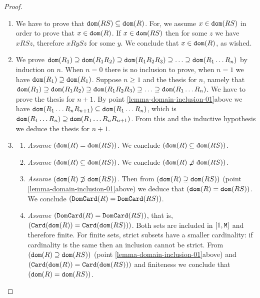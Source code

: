\documentclass{lmcs}
\begin{document}
\begin{proof}
\begin{enumerate}

\item
We have to prove that ${\tt dom}(RS) \subseteq {\tt dom}(R)$. For, we assume $x \in {\tt dom}(RS)$ in 
order to prove that $x \in {\tt dom}(R)$. If $x \in {\tt dom}(RS)$ then for some $z$ we have $x RS z$, 
therefore $x R y S z$ for some $y$. We conclude that $x \in {\tt dom}(R)$, as wished.

\item
We prove 
$
{\tt dom}(R_1) \supseteq 
{\tt dom}(R_1 R_2) \supseteq 
{\tt dom}(R_1 R_2 R_3) \supseteq 
\ldots \supseteq 
{\tt dom}(R_1 \ldots R_n)
$ 
by induction on $n$. 
When $n=0$ there is no inclusion to prove, when $n=1$ we have 
${\tt dom}(R_1) \supseteq {\tt dom}(R_1)$. Suppose $n \ge 1$ and the thesis 
for $n$, namely that ${\tt dom}(R_1) \supseteq {\tt dom}(R_1 R_2) \supseteq {\tt dom}(R_1 R_2 R_3) 
\supseteq \ldots \supseteq {\tt dom}(R_1 \ldots R_n)$. We have to prove the thesis for $n+1$. 
By point \ref{lemma-domain-inclusion-01}above 
we have ${\tt dom}(R_1 \ldots R_{n} R_{n+1}) \subseteq {\tt dom}(R_1 \ldots R_{n})$, which is
${\tt dom}(R_1 \ldots R_{n}) \supseteq {\tt dom}(R_1 \ldots R_{n} R_{n+1})$. 
From this and the inductive hypothesis we deduce the thesis for $n+1$.

\item
\begin{enumerate}
\item
\emph{Assume $({\tt dom}(R) = {\tt dom}(RS))$}. 
We conclude $({\tt dom}(R) \subseteq {\tt dom}(RS))$. 
\item
\emph{Assume $({\tt dom}(R) \subseteq {\tt dom}(RS))$}. 
We conclude $({\tt dom}(R) \not \supset {\tt dom}(RS))$.
\item
\emph{Assume $({\tt dom}(R) \not \supset {\tt dom}(RS))$}. 
Then from $({\tt dom}(R) \supseteq {\tt dom}(RS))$
(point \ref{lemma-domain-inclusion-01}above) we deduce that $({\tt dom}(R) = {\tt dom}(RS))$.
We conclude $({\tt DomCard}(R) = {\tt DomCard}(RS))$. 
\item
\emph{Assume $({\tt DomCard}(R) = {\tt DomCard}(RS))$}, 
that is, $({\tt Card}({\tt dom}(R)) = {\tt Card}({\tt dom}(RS)))$.
Both sets are included in $[1,{\tt M}]$ and therefore finite.
For finite sets, strict subsets have a smaller cardinality: if cardinality is the same
then an inclusion cannot be strict.
From $({\tt dom}(R) \supseteq {\tt dom}(RS))$
(point \ref{lemma-domain-inclusion-01}above) 
and $({\tt Card}({\tt dom}(R)) = {\tt Card}({\tt dom}(RS)))$ and finiteness 
we conclude that $({\tt dom}(R) = {\tt dom}(RS))$.
\end{enumerate}


\end{enumerate}
\end{proof}
\end{document}
